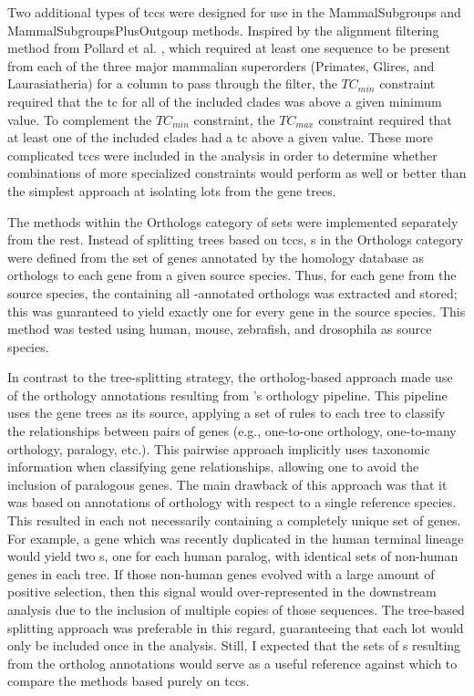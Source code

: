 Two additional types of \acp{tcc} were designed for use in the
MammalSubgroups and MammalSubgroupsPlusOutgoup methods. Inspired by
the alignment filtering method from Pollard et
al. \citeyearpar{Pollard2010}, which required at least one sequence to
be present from each of the three major mammalian superorders
(Primates, Glires, and Laurasiatheria) for a column to pass through
the filter, the $TC_{min}$ constraint required that the \ac{tc} for all
of the included clades was above a given minimum value. To complement
the $TC_{min}$ constraint, the $TC_{max}$ constraint required that at
least one of the included clades had a \ac{tc} above a given
value. These more complicated \acp{tcc} were included in the analysis
in order to determine whether combinations of more specialized
constraints would perform as well or better than the simplest approach
at isolating \acp{lot} from the \cmp gene trees.

The methods within the Orthologs category of \subtr{} sets were
implemented separately from the rest. Instead of splitting \cmp trees
based on \acp{tcc}, \subtr{}s in the Orthologs category were defined
from the set of genes annotated by the \ens homology database as
orthologs to each gene from a given source species. Thus, for each
gene from the source species, the \cmp \subtr containing all
\ens{}-annotated orthologs was extracted and stored; this was
guaranteed to yield exactly one \subtr{} for every gene in the source
species. This method was tested using human, mouse, zebrafish, and
drosophila as source species.

In contrast to the tree-splitting strategy, the ortholog-based
approach made use of the orthology annotations resulting from \ens{}'s
orthology pipeline.  This pipeline uses the \cmp gene trees as its
source, applying a set of rules to each tree to classify the
relationships between pairs of genes (e.g., one-to-one orthology,
one-to-many orthology, paralogy, etc.). This pairwise approach
implicitly uses taxonomic information when classifying gene
relationships, allowing one to avoid the inclusion of paralogous
genes. The main drawback of this approach was that it was based on
annotations of orthology with respect to a single reference
species. This resulted in each \subtr{} not necessarily containing a
completely unique set of genes. For example, a gene which was recently
duplicated in the human terminal lineage would yield two \subtr{}s,
one for each human paralog, with identical sets of non-human genes in
each tree. If those non-human genes evolved with a large amount of
positive selection, then this signal would over-represented in the
downstream analysis due to the inclusion of multiple copies of those
sequences. The tree-based \subtr splitting approach was preferable in
this regard, guaranteeing that each \ac{lot} would only be included
once in the analysis. Still, I expected that the sets of \subtr{}s
resulting from the \ens ortholog annotations would serve as a useful
reference against which to compare the methods based purely on
\acp{tcc}.


